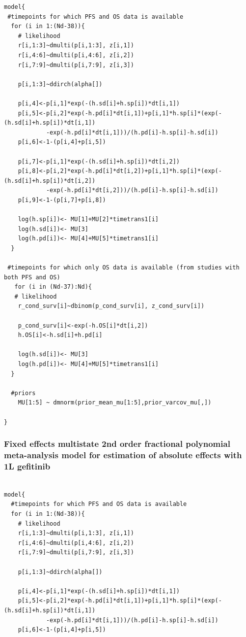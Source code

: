 \documentclass[11pt,final,fleqn]{article}\usepackage[]{graphicx}\usepackage[]{color}
\theoremstyle{plain}
\begin{document}
\begin{appendices}
\begin{verbatim}
model{
 #timepoints for which PFS and OS data is available
  for (i in 1:(Nd-38)){
    # likelihood
    r[i,1:3]~dmulti(p[i,1:3], z[i,1]) 
    r[i,4:6]~dmulti(p[i,4:6], z[i,2]) 
    r[i,7:9]~dmulti(p[i,7:9], z[i,3]) 
    
    p[i,1:3]~ddirch(alpha[])
    
    p[i,4]<-p[i,1]*exp(-(h.sd[i]+h.sp[i])*dt[i,1])
    p[i,5]<-p[i,2]*exp(-h.pd[i]*dt[i,1])+p[i,1]*h.sp[i]*(exp(-(h.sd[i]+h.sp[i])*dt[i,1])
    		-exp(-h.pd[i]*dt[i,1]))/(h.pd[i]-h.sp[i]-h.sd[i])
    p[i,6]<-1-(p[i,4]+p[i,5])
    
    p[i,7]<-p[i,1]*exp(-(h.sd[i]+h.sp[i])*dt[i,2])
    p[i,8]<-p[i,2]*exp(-h.pd[i]*dt[i,2])+p[i,1]*h.sp[i]*(exp(-(h.sd[i]+h.sp[i])*dt[i,2])
    		-exp(-h.pd[i]*dt[i,2]))/(h.pd[i]-h.sp[i]-h.sd[i])
    p[i,9]<-1-(p[i,7]+p[i,8])
    
    log(h.sp[i])<- MU[1]+MU[2]*timetrans1[i] 
    log(h.sd[i])<- MU[3] 
    log(h.pd[i])<- MU[4]+MU[5]*timetrans1[i]
  }
  
 #timepoints for which only OS data is available (from studies with both PFS and OS)
   for (i in (Nd-37):Nd){
   # likelihood
    r_cond_surv[i]~dbinom(p_cond_surv[i], z_cond_surv[i]) 
    
    p_cond_surv[i]<-exp(-h.OS[i]*dt[i,2])
    h.OS[i]<-h.sd[i]+h.pd[i]
    
    log(h.sd[i])<- MU[3]
    log(h.pd[i])<- MU[4]+MU[5]*timetrans1[i]
  }
    
  #priors
    MU[1:5] ~ dmnorm(prior_mean_mu[1:5],prior_varcov_mu[,]) 
  
}

\end{verbatim}

\subsubsection{Fixed effects multistate 2nd order fractional polynomial meta-analysis model for estimation of absolute effects with 1L gefitinib}

\begin{verbatim} 

model{
  #timepoints for which PFS and OS data is available
  for (i in 1:(Nd-38)){
    # likelihood
    r[i,1:3]~dmulti(p[i,1:3], z[i,1]) 
    r[i,4:6]~dmulti(p[i,4:6], z[i,2]) 
    r[i,7:9]~dmulti(p[i,7:9], z[i,3]) 
    
    p[i,1:3]~ddirch(alpha[])
    
    p[i,4]<-p[i,1]*exp(-(h.sd[i]+h.sp[i])*dt[i,1])
    p[i,5]<-p[i,2]*exp(-h.pd[i]*dt[i,1])+p[i,1]*h.sp[i]*(exp(-(h.sd[i]+h.sp[i])*dt[i,1])
    		-exp(-h.pd[i]*dt[i,1]))/(h.pd[i]-h.sp[i]-h.sd[i])
    p[i,6]<-1-(p[i,4]+p[i,5])
    

\end{verbatim}
\end{appendices}
\end{document}
